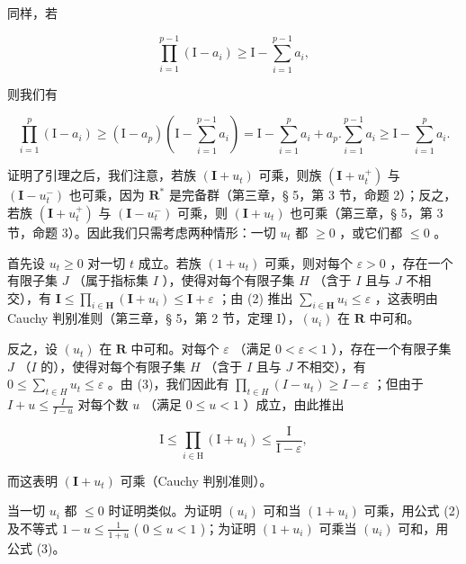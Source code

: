 同样，若

\[
\prod_ {i = 1} ^ {p - 1} \left(\mathrm{I} - a _ {i}\right) \geqslant \mathrm{I} - \sum_ {i = 1} ^ {p - 1} a _ {i},
\]

则我们有

\[
\prod_ {i = 1} ^ {p} \left(\mathrm{I} - a _ {i}\right) \geqslant \left(\mathrm{I} - a _ {p}\right) \left(\mathrm{I} - \sum_ {i = 1} ^ {p - 1} a _ {i}\right) = \mathrm{I} - \sum_ {i = 1} ^ {p} a _ {i} + a _ {p}. \sum_ {i = 1} ^ {p - 1} a _ {i} \geqslant \mathrm{I} - \sum_ {i = 1} ^ {p} a _ {i}.
\]

证明了引理之后，我们注意，若族 \((\mathbf{I} + u_{t})\) 可乘，则族 \((\mathbf{I} + u_{t}^{+})\) 与 \((\mathbf{I} - u_{t}^{-})\) 也可乘，因为 \(\mathbf{R}^*\) 是完备群（第三章，§ 5，第 3 节，命题 2）；反之，若族 \((\mathbf{I} + u_{t}^{+})\) 与 \((\mathbf{I} - u_{t}^{-})\) 可乘，则 \((\mathbf{I} + u_{t})\) 也可乘（第三章，§ 5，第 3 节，命题 3）。因此我们只需考虑两种情形：一切 \(u_{t}\) 都 \(\geqslant 0\) ，或它们都 \(\leqslant 0\) 。

首先设 \(u_{t} \geqslant 0\) 对一切 \(t\) 成立。若族 \((1 + u_{t})\) 可乘，则对每个 \(\varepsilon > 0\) ，存在一个有限子集 \(J\) （属于指标集 \(I\) ），使得对每个有限子集 \(H\) （含于 \(I\) 且与 \(J\) 不相交），有 \(\mathbf{I} \leqslant \prod_{i \in \mathbf{H}} (\mathbf{I} + u_i) \leqslant \mathbf{I} + \varepsilon\) ；由 (2) 推出 \(\sum_{i \in \mathbf{H}} u_i \leqslant \varepsilon\) ，这表明由 Cauchy 判别准则（第三章，§ 5，第 2 节，定理 I），\((u_i)\) 在 \(\mathbf{R}\) 中可和。

反之，设 \((u_{t})\) 在 \(\mathbf{R}\) 中可和。对每个 \(\varepsilon\) （满足 \(0 < \varepsilon < 1\) ），存在一个有限子集 \(J\) （\(I\) 的），使得对每个有限子集 \(H\) （含于 \(I\) 且与 \(J\) 不相交），有 \(0 \leqslant \sum_{t \in H} u_{t} \leqslant \varepsilon\) 。由 (3)，我们因此有 \(\prod_{t \in H} (I - u_{t}) \geqslant I - \varepsilon\) ；但由于 \(I + u \leqslant \frac{I}{I - u}\) 对每个数 \(u\) （满足 \(0 \leqslant u < 1\) ）成立，由此推出

\[
\mathrm{I} \leqslant \prod_ {i \in \mathrm{H}} (\mathrm{I} + u _ {i}) \leqslant \frac {\mathrm{I}}{\mathrm{I} - \varepsilon},
\]

而这表明 \((\mathbf{I} + u_{t})\) 可乘（Cauchy 判别准则）。

当一切 \(u_{i}\) 都 \(\leqslant 0\) 时证明类似。为证明 \((u_{i})\) 可和当 \((1 + u_{i})\) 可乘，用公式 (2) 及不等式 \(1 - u \leqslant \frac{1}{1 + u}\) ( \(0 \leqslant u < 1\) )；为证明 \((1 + u_{i})\) 可乘当 \((u_{i})\) 可和，用公式 (3)。

